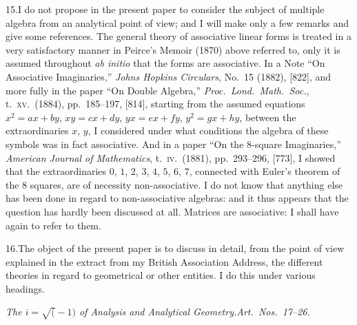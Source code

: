 \documentclass[11pt]{article}
\begin{document}
15.\quad I do not propose in the present paper to consider the subject of multiple algebra from an analytical point of view; and I will make only a few remarks and give some references. The general theory of associative linear forms is treated in a very satisfactory manner in Peirce's Memoir (1870) above referred to, only it is assumed throughout \textit{ab initio} that the forms are associative. In a Note ``On Associative Imaginaries,'' \textit{Johns Hopkins Circulars}, No.~15 (1882), [822], and more fully in the paper ``On Double Algebra,'' \textit{Proc.\ Lond.\ Math.\ Soc.}, t.~\textsc{xv}.\ (1884), pp.~185--197, [814], starting from the assumed equations $x^{2} = ax + by$, $xy = cx + dy$, $yx = ex + fy$, $y^{2} = gx + hy$, between the extraordinaries $x$, $y$, I considered under what conditions the algebra of these symbols was in fact associative. And in a paper ``On the 8-square Imaginaries,'' \textit{American Journal of Mathematics}, t.~\textsc{iv}.\ (1881), pp.~293--296, [773], I showed that the extraordinaries $0$, $1$, $2$, $3$, $4$, $5$, $6$, $7$, connected with Euler's theorem of the 8 squares, are of necessity non-associative. I do not know that anything else has been done in regard to non-associative algebras: and it thus appears that the question has hardly been discussed at all. Matrices are associative: I shall have again to refer to them.

16.\quad The object of the present paper is to discuss in detail, from the point of view explained in the extract from my British Association Address, the different theories in regard to geometrical or other entities. I do this under various headings.

\medskip

\begin{center}\textit{The $i = \surd(-1)$ of Analysis and Analytical Geometry.\quad Art.~Nos.~17--26.}\end{center}

\medskip
\end{document}
